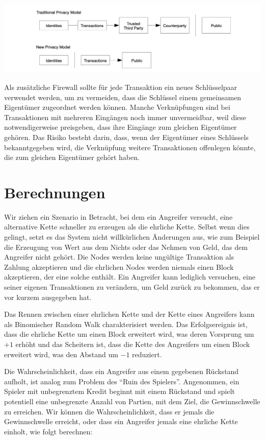 \documentclass[10pt]{article}
\begin{document}
	\begin{center}
		\includegraphics[scale=0.3]{pics/privacy.png}
	\end{center}
	
	Als zusätzliche Firewall sollte für jede Transaktion ein neues Schlüsselpaar verwendet werden, um zu vermeiden, dass die Schlüssel einem gemeinsamen Eigentümer zugeordnet werden können. Manche Verknüpfungen sind bei Transaktionen mit mehreren Eingängen noch immer unvermeidbar, weil diese notwendigerweise preisgeben, dass ihre Eingänge zum gleichen Eigentümer gehören. Das Risiko besteht darin, dass, wenn der Eigentümer eines Schlüssels bekanntgegeben wird, die Verknüpfung weitere Transaktionen offenlegen könnte, die zum gleichen Eigentümer gehört haben.
	
	\section{Berechnungen}
	
	Wir ziehen ein Szenario in Betracht, bei dem ein Angreifer versucht, eine alternative Kette schneller zu erzeugen als die ehrliche Kette. Selbst wenn dies gelingt, setzt es das System nicht willkürlichen Änderungen aus, wie zum Beispiel die Erzeugung von Wert aus dem Nichts oder das Nehmen von Geld, das dem Angreifer nicht gehört. Die Nodes werden keine ungültige Transaktion als Zahlung akzeptieren und die ehrlichen Nodes werden niemals einen Block akzeptieren, der eine solche enthält. Ein Angreifer kann lediglich versuchen, eine seiner eigenen Transaktionen zu verändern, um Geld zurück zu bekommen, das er vor kurzem ausgegeben hat.

	Das Rennen zwischen einer ehrlichen Kette und der Kette eines Angreifers kann als Binomischer Random Walk charakterisiert werden. Das Erfolgsereignis ist, dass die ehrliche Kette um einen Block erweitert wird, was deren Vorsprung um $+1$ erhöht und das Scheitern ist, dass die Kette des Angreifers um einen Block erweitert wird, was den Abstand um $-1$ reduziert.

	Die Wahrscheinlichkeit, dass ein Angreifer aus einem gegebenen Rückstand aufholt, ist analog zum Problem des “Ruin des Spielers”. Angenommen, ein Spieler mit unbegrenztem Kredit beginnt mit einem Rückstand und spielt potentiell eine unbegrenzte Anzahl von Partien, mit dem Ziel, die Gewinnschwelle zu erreichen. Wir können die Wahrscheinlichkeit, dass er jemals die Gewinnschwelle erreicht, oder dass ein Angreifer jemals eine ehrliche Kette einholt, wie folgt berechnen\cite{feller}:
	
\end{document}
